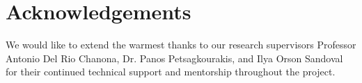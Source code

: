 \documentclass[conference]{IEEEtran}
\theoremstyle{definition}
\begin{document}
\section{Acknowledgements}
\noindent We would like to extend the warmest thanks to our research supervisors Professor Antonio Del Rio Chanona, Dr. Panos Petsagkourakis, and Ilya Orson Sandoval for their continued technical support and mentorship throughout the project. 





































\end{document}

